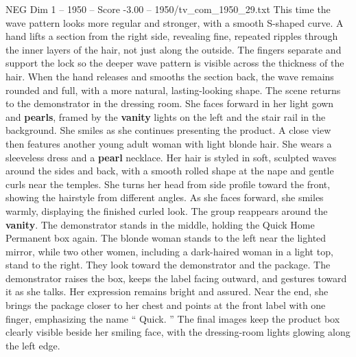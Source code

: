 \begin{textsample}{NEG Dim 1 – 1950 – Score -3.00 – 1950/tv\_com\_1950\_29.txt}
This time the wave pattern looks more regular and stronger, with a smooth S-shaped curve.
A hand lifts a section from the right side, revealing fine, repeated ripples through the inner layers of the hair, not just along the outside.
The fingers separate and support the lock so the deeper wave pattern is visible across the thickness of the hair.
When the hand releases and smooths the section back, the wave remains rounded and full, with a more natural, lasting-looking shape.
The scene returns to the demonstrator in the dressing room.
She faces forward in her light gown and \textbf{pearls}, framed by the \textbf{vanity} lights on the left and the stair rail in the background.
She smiles as she continues presenting the product.
A close view then features another young adult woman with light blonde hair.
She wears a sleeveless dress and a \textbf{pearl} necklace.
Her hair is styled in soft, sculpted waves around the sides and back, with a smooth rolled shape at the nape and gentle curls near the temples.
She turns her head from side profile toward the front, showing the hairstyle from different angles.
As she faces forward, she smiles warmly, displaying the finished curled look.
The group reappears around the \textbf{vanity}.
The demonstrator stands in the middle, holding the Quick Home Permanent box again.
The blonde woman stands to the left near the lighted mirror, while two other women, including a dark-haired woman in a light top, stand to the right.
They look toward the demonstrator and the package.
The demonstrator raises the box, keeps the label facing outward, and gestures toward it as she talks.
Her expression remains bright and assured.
Near the end, she brings the package closer to her chest and points at the front label with one finger, emphasizing the name “ Quick. ” The final images keep the product box clearly visible beside her smiling face, with the dressing-room lights glowing along the left edge.

\end{textsample}
